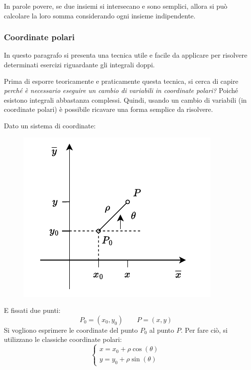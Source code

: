 \documentclass[a4paper]{article}
\begin{document}
	In parole povere, se due insiemi si intersecano e sono semplici, allora si può calcolare la loro somma considerando ogni insieme indipendente.\newpage
	
	\subsubsection{Coordinate polari}

	In questo paragrafo si presenta una tecnica utile e facile da applicare per risolvere determinati esercizi riguardante gli integrali doppi.\newline

	\noindent
	Prima di esporre teoricamente e praticamente questa tecnica, si cerca di capire \emph{perché è necessario eseguire un cambio di variabili in coordinate polari?} Poiché esistono integrali abbastanza complessi. Quindi, usando un cambio di variabili (in coordinate polari) è possibile ricavare una forma semplice da risolvere.\newline

	\noindent
	Dato un sistema di coordinate:
	\begin{figure}[!htp]
		\centering
		\includegraphics[width=.5\textwidth]{img/integrali_doppi-coordinate_polari.pdf}
	\end{figure}
	
	\noindent
	E fissati due punti:
	\begin{equation*}
		P_{0} = \left(x_{0}, y_{0}\right)
		\hspace{2em}
		P = \left(x,y\right)
	\end{equation*}
	Si vogliono esprimere le coordinate del punto $P_{0}$ al punto $P$. Per fare ciò, si utilizzano le classiche coordinate polari:
	\begin{equation}\label{eq: coordinate polari}
		\begin{cases}
			x = x_{0} + \rho\cos\left(\theta\right) \\
			y = y_{0} + \rho\sin\left(\theta\right)
		\end{cases}
	\end{equation}
\end{document}
